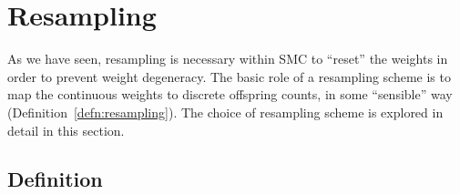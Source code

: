 \section{Resampling \seb{$\sim$} }
As we have seen, resampling is necessary within SMC to ``reset'' the weights in order to prevent weight degeneracy.
The basic role of a resampling scheme is to map the continuous weights to discrete offspring counts, in some ``sensible'' way (Definition~\ref{defn:resampling}).
The choice of resampling scheme is explored in detail in this section.

\subsection{Definition \seb{$\checkmark$} }

